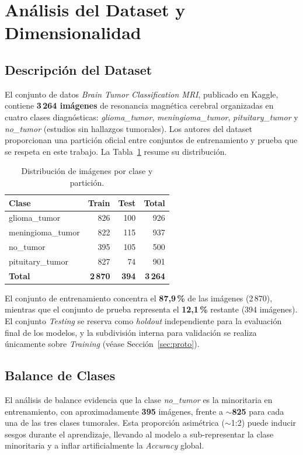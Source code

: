 \section{Análisis del Dataset y Dimensionalidad}
\label{sec:eda}

\subsection{Descripción del Dataset}
El conjunto de datos \textit{Brain Tumor Classification MRI},
publicado en Kaggle, contiene \textbf{3\,264 imágenes} de
resonancia magnética cerebral organizadas en cuatro clases
diagnósticas: \textit{glioma\_tumor}, \textit{meningioma\_tumor},
\textit{pituitary\_tumor} y \textit{no\_tumor} (estudios sin
hallazgos tumorales). Los autores del dataset proporcionan una
partición oficial entre conjuntos de entrenamiento y prueba que
se respeta en este trabajo. La Tabla~\ref{tab:dist} resume su
distribución.

\begin{table}[!t]
\centering
\caption{Distribución de imágenes por clase y partición.}
\label{tab:dist}
\begin{tabular}{lrrr}
\toprule
\textbf{Clase} & \textbf{Train} & \textbf{Test} & \textbf{Total} \\
\midrule
glioma\_tumor      & 826 & 100 & 926 \\
meningioma\_tumor  & 822 & 115 & 937 \\
no\_tumor          & 395 & 105 & 500 \\
pituitary\_tumor   & 827 &  74 & 901 \\
\midrule
\textbf{Total}     & \textbf{2\,870} & \textbf{394} & \textbf{3\,264} \\
\bottomrule
\end{tabular}
\end{table}

El conjunto de entrenamiento concentra el \textbf{87{,}9\,\%}
de las imágenes (2\,870), mientras que el conjunto de prueba
representa el \textbf{12{,}1\,\%} restante (394 imágenes). El
conjunto \textit{Testing} se reserva como \textit{holdout}
independiente para la evaluación final de los modelos, y la
subdivisión interna para validación se realiza únicamente sobre
\textit{Training} (véase Sección~\ref{sec:proto}).

\subsection{Balance de Clases}
El análisis de balance evidencia que la clase \textit{no\_tumor}
es la minoritaria en entrenamiento, con aproximadamente
\textbf{395} imágenes, frente a $\sim$\textbf{825} para cada una
de las tres clases tumorales. Esta proporción asimétrica
($\sim$1:2) puede inducir sesgos durante el aprendizaje, llevando
al modelo a sub-representar la clase minoritaria y a inflar
artificialmente la \textit{Accuracy} global.

